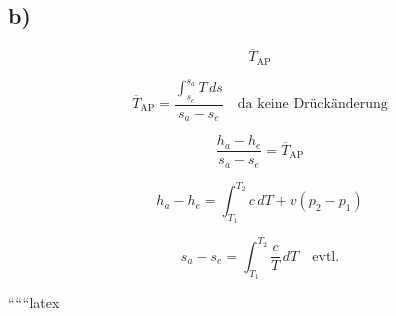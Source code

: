 

\subsection*{b)}

\[
\overline{T}_{\text{AP}}
\]

\[
\overline{T}_{\text{AP}} = \frac{\int_{s_e}^{s_a} T \, ds}{s_a - s_e} \quad \text{da keine Drückänderung}
\]

\[
\frac{h_a - h_e}{s_a - s_e} = \overline{T}_{\text{AP}}
\]

\[
h_a - h_e = \int_{T_1}^{T_2} c \, dT + v(p_2 - p_1)
\]

\[
s_a - s_e = \int_{T_1}^{T_2} \frac{c}{T} \, dT \quad \text{evtl.}
\]

``````latex